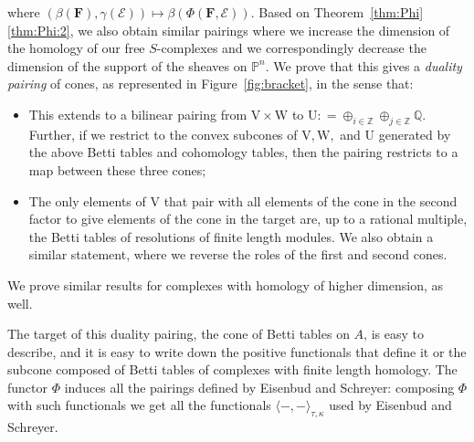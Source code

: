 \documentclass[12pt]{amsart}
\theoremstyle{definition}
\theoremstyle{remark}
\newcommand{\ZZ}{\mathbb{Z}}
\newcommand{\QQ}{\mathbb{Q}}
\newcommand{\UU}{\mathrm{U}}
\newcommand{\VV}{\mathrm{V}}
\newcommand{\WW}{\mathrm{W}}
\newcommand{\cE}{\mathcal{E}}
\newcommand{\FF}{\mathbf{F}}
\begin{document}
where $(\beta(\FF),\gamma(\cE))\mapsto \beta(\Phi(\FF,\cE))$.  Based on Theorem~\ref{thm:Phi}\eqref{thm:Phi:2}, we also obtain similar pairings where we increase the dimension of the homology of our free $S$-complexes and we correspondingly decrease the dimension of the support of the sheaves on $\mathbb P^n$.  We prove that this  gives a  \emph{duality pairing} of cones, as represented in Figure~\ref{fig:bracket},
in the sense that:
\begin{itemize}
\item This extends to a bilinear pairing from $\VV\times \WW$ to $\UU: = \oplus_{i\in \ZZ} \oplus_{j\in \ZZ}\QQ$.  Further, if we restrict to the convex subcones of $\VV, \WW,$ and $\UU$ generated by the above Betti tables and cohomology tables, then the pairing restricts to a map between these three cones;
\item The only elements of $\VV$ that pair with all elements of the cone in the second factor
 to give elements of the cone in the target are, up to a rational multiple, the Betti tables of  resolutions of finite length modules.  We also obtain a similar statement, where we reverse the roles of 
 the first and second cones.
\end{itemize} 
 We prove similar results for complexes with homology of higher dimension, as well. 

The target of this duality pairing, the cone of Betti tables on $A$, is easy to describe, and it is easy to write down the positive functionals that define it or the subcone composed of Betti tables of complexes with finite length homology. 
The functor $\Phi$ induces all the pairings defined by Eisenbud and Schreyer: composing $\Phi$ with such functionals we get all the functionals $\langle -,-\rangle_{\tau,\kappa}$ used by Eisenbud and Schreyer.
\end{document}
